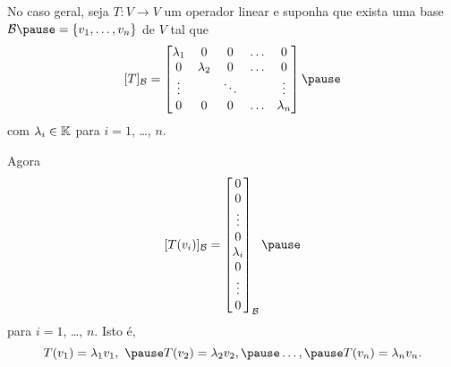 \documentclass{beamer}
\begin{document}
    \begin{frame}
        No caso geral, \pause seja $T : V \to V$ um operador linear \pause e suponha que exista uma base $\mathcal{B} \pause =
        \{v_1,\dots,v_n\}$ \pause de $V$ tal que\pause
        \begin{align}\label{formadiagonal}
            [T]_\mathcal{B} = \begin{bmatrix}
                \lambda_1 & 0 & 0 & \dots & 0\\
                0 & \lambda_2 & 0 & \dots & 0\\
                \vdots & & \ddots & & \vdots\\
                0 & 0 & 0 & \dots & \lambda_n
            \end{bmatrix}\pause
        \end{align}
        com $\lambda_i \in \mathbb{K}$ para $i = 1$, \dots, $n$.
    \end{frame}

    \begin{frame}
        Agora\pause
        \[
            [T(v_i)]_\mathcal{B} =
            \begin{bmatrix}
            0\\
            0\\
            \vdots\\
            0\\
            \lambda_i\\
            0\\
            \vdots\\
            0
        \end{bmatrix}_\mathcal{B}\pause
        \]
        para $i = 1$, \dots, $n$. \pause Isto é,\pause
        \[
            T(v_1) = \lambda_1 v_1,\ \pause T(v_2) = \lambda_2 v_2,\pause \dots,\pause  T(v_n) = \lambda_n v_n.
        \]
    \end{frame}
\end{document}
